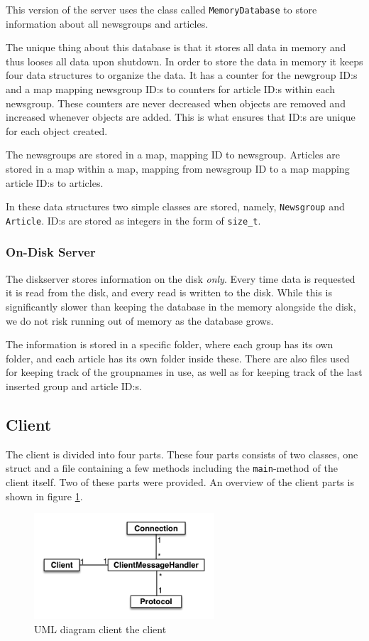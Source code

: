 \documentclass[a4paper]{article}
\begin{document}
This version of the server uses the class called \texttt{MemoryDatabase} to store information about all newsgroups and articles.

The unique thing about this database is that it stores all data in memory and thus looses all data upon shutdown. In order to store the data in memory it keeps four data structures to organize the data. It has a counter for the newgroup ID:s and a map mapping newsgroup ID:s to counters for article ID:s within each newsgroup. These counters are never decreased when objects are removed and increased whenever objects are added. This is what ensures that ID:s are unique for each object created.

The newsgroups are stored in a map, mapping ID to newsgroup. Articles are stored in a map within a map, mapping from newsgroup ID to a map mapping article ID:s to articles.

In these data structures two simple classes are stored, namely, \texttt{Newsgroup} and \texttt{Article}. ID:s are stored as integers in the form of \texttt{size\_t}.


\subsubsection{On-Disk Server}
The diskserver stores information on the disk \emph{only}. Every time data is requested it is read from the disk, and every read is written to the disk. While this is significantly slower than keeping the database in the memory alongside the disk, we do not risk running out of memory as the database grows.

The information is stored in a specific folder, where each group has its own folder, and each article has its own folder inside these. There are also files used for keeping track of the groupnames in use, as well as for keeping track of the last inserted group and article ID:s.

\subsection{Client}
The client is divided into four parts. These four parts consists of two classes, one struct and a file containing a few methods including the \texttt{main}-method of the client itself. Two of these parts were provided. An overview of the client parts is shown in figure \ref{clientUML}.

\begin{figure}
    \centering
    \includegraphics[width=0.6\textwidth]{projectUML-client.png}
    \caption{UML diagram client the client}
    \label{clientUML}
\end{figure}
\end{document}
